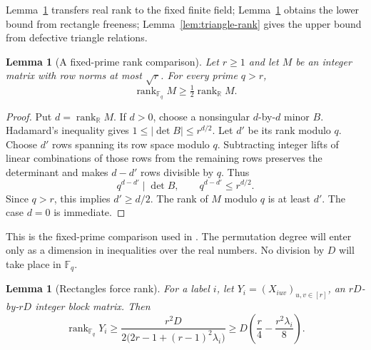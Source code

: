 \documentclass[11pt]{amsart}
\newtheorem{lemma}[theorem]{Lemma}
\theoremstyle{definition}
\theoremstyle{remark}
\numberwithin{equation}{section}
\newcommand{\F}{\mathbb F}
\newcommand{\R}{\mathbb R}
\DeclareMathOperator{\rank}{rank}
\begin{document}
Lemma~\ref{lem:reduction} transfers real rank to the fixed finite
field; Lemma~\ref{lem:rectangle-rank} obtains the lower bound from
rectangle freeness; Lemma~\ref{lem:triangle-rank} gives the upper
bound from defective triangle relations.

\begin{lemma}[A fixed-prime rank comparison]\label{lem:reduction}
Let $r\ge1$ and let $M$ be an integer matrix with row norms at most $\sqrt r$.
For every prime $q>r$,
\[
 \rank_{\F_q}M\ge\tfrac12\rank_{\R}M.
\]
\end{lemma}

\begin{proof}
Put $d=\rank_\R M$. If $d>0$, choose a nonsingular $d$-by-$d$
minor $B$. Hadamard's inequality gives
$1\le|\det B|\le r^{d/2}$. Let $d'$ be its rank modulo $q$.
Choose $d'$ rows spanning its row space modulo $q$. Subtracting
integer lifts of linear combinations of those rows from the remaining
rows preserves the determinant and makes $d-d'$ rows divisible by
$q$. Thus
\[
 q^{d-d'}\mid\det B,\qquad q^{d-d'}\le r^{d/2}.
\]
Since $q>r$, this implies $d'\ge d/2$. The rank of $M$ modulo $q$
is at least $d'$. The case $d=0$ is immediate.
\end{proof}

This is the fixed-prime comparison used in \cite{OA252}. The
permutation degree will enter only as a dimension in inequalities
over the real numbers. No division by $D$ will take place in $\F_q$.

\begin{lemma}[Rectangles force rank]\label{lem:rectangle-rank}
For a label $i$, let $Y_i=(X_{iuv})_{u,v\in[r]}$, an
$rD$-by-$rD$ integer block matrix. Then
\begin{equation}\label{eq:label-rank}
 \rank_{\F_q}Y_i\ge
 \frac{r^2D}{2\bigl(2r-1+(r-1)^2\lambda_i\bigr)}
 \ge D\left(\frac r4-\frac{r^2\lambda_i}{8}\right).
\end{equation}
\end{lemma}
\end{document}
